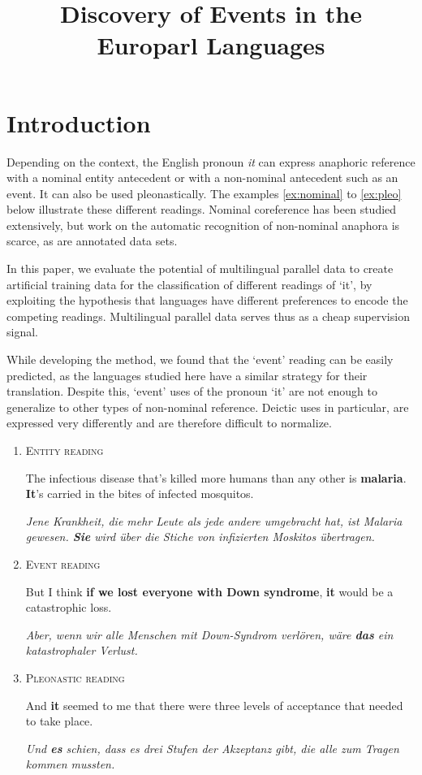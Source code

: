 \documentclass[10pt, a4paper]{article} \usepackage{lrec} \usepackage{multibib}
\title{Discovery of Events in the Europarl Languages}
\begin{document}
\maketitleabstract

\section{Introduction}

Depending on the context, the English pronoun \textit{it} can express anaphoric
reference with a nominal entity antecedent or with a
non-nominal antecedent such as an event. It can also be used
pleonastically. The examples \ref{ex:nominal} to \ref{ex:pleo} below illustrate these different readings. Nominal coreference has been studied
extensively, but work on the automatic recognition of non-nominal anaphora is
scarce, as are annotated data sets.

In this paper, we evaluate the potential of multilingual parallel data to create artificial 
training data  
for the classification of different readings of `it', by exploiting the hypothesis that languages 
have different preferences to encode
the competing readings. Multilingual parallel data serves thus as a cheap
supervision signal. 

While developing the method, we found that the `event' reading can be easily
predicted, as the languages studied here have a similar strategy for their translation. 
Despite this, `event' uses of the pronoun `it' are not enough to generalize to
other types of non-nominal reference. Deictic uses in particular, are expressed
very differently and are therefore difficult to normalize.

%
%
\begin{enumerate}

\item\label{ex:nominal} \textsc{Entity reading}

The infectious disease that's killed more humans than any other is
\textbf{malaria}.  \textbf{It}'s carried in the bites of infected mosquitos.

\textit{Jene Krankheit, die mehr Leute als jede andere umgebracht hat, ist
Malaria gewesen. \textbf{Sie} wird über die Stiche von infizierten Moskitos
übertragen.}

\item\label{ex:event}\textsc{Event reading}

But I think \textbf{if we lost everyone with Down syndrome},  \textbf{it} would
be a catastrophic loss.

\textit{Aber, wenn wir alle Menschen mit Down-Syndrom verlören, wäre
\textbf{das}    ein katastrophaler Verlust.}

\item\label{ex:pleo} \textsc{Pleonastic reading}

And  \textbf{it} seemed to me that there were three levels of acceptance that
needed to take place.

\textit{Und \textbf{es} schien, dass es drei Stufen der Akzeptanz gibt, die alle
zum Tragen kommen mussten.}

\end{enumerate}
\end{document}
